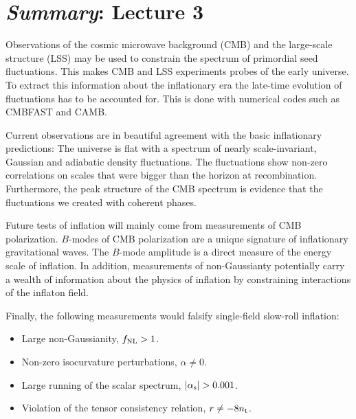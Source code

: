 \documentclass[12pt,letterpaper,rotate]{article}
\begin{document}
{\newpage
\section{{\sl Summary}: Lecture 3}

\vskip 10pt
Observations of the cosmic microwave background (CMB) and the large-scale structure (LSS) may be used to constrain the spectrum of primordial seed fluctuations.
This makes CMB and LSS experiments probes of the early universe.
To extract this information about the inflationary era the late-time evolution of fluctuations has to be accounted for.
This is done with numerical codes such as {\sf CMBFAST} and {\sf CAMB}.

\vskip 6pt
Current observations are in beautiful agreement with the basic inflationary predictions:
The universe is flat with a spectrum of nearly scale-invariant, Gaussian and adiabatic density fluctuations. The fluctuations show non-zero correlations on scales that were bigger than the horizon at recombination. Furthermore, the peak structure of the CMB spectrum is evidence that the fluctuations we created with coherent phases.

\vskip 6pt
Future tests of inflation will mainly come from measurements of CMB polarization.
$B$-modes of CMB polarization are a unique signature of inflationary gravitational waves.
The $B$-mode amplitude is a direct measure of the energy scale of inflation.
In addition,  measurements of non-Gaussianty potentially carry a wealth of information about the physics of inflation by constraining interactions of the inflaton field.

\vskip 6pt
Finally,
the following measurements would falsify single-field slow-roll inflation:
\begin{itemize}
\item Large non-Gaussianity, $f_{\rm NL} > 1$.
\item Non-zero isocurvature perturbations, $\alpha \ne 0$.
\item Large running of the scalar spectrum, $|\alpha_{\rm s}| > 0.001$.
\item Violation of the tensor consistency relation, $r \ne - 8 n_{\rm t}$. 
\end{itemize}




}
\end{document}
